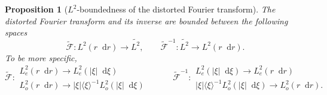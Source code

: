 \documentclass[11 pt]{amsart}
\newtheorem{prop}{Proposition}[section]
\theoremstyle{definition}
\theoremstyle{remark}
\numberwithin{equation}{section}
\newcommand{\dd}{\mathop{}\!\mathrm{d}}
\begin{document}
\begin{prop}[$L^2$-boundedness of the distorted Fourier transform]
\label{propL2}
The distorted Fourier transform and its inverse are bounded between the following spaces
$$
\widetilde{\mathcal{F}} : L^2(r \dd r) \longrightarrow \widetilde{L^2}, \qquad \widetilde{\mathcal{F}}^{-1} : \widetilde{L^2}\longrightarrow L^2(r \dd r). 
$$
To be more specific,
$$
\widetilde{\mathcal{F}} : \begin{array}{l}  L^2_{e}(r\dd r) \longrightarrow L^2_{e}(|\xi|\dd \xi) \\ L^2_{o}(r\dd r) \longrightarrow |\xi| \langle \xi \rangle^{-1}L^2_{o}(|\xi|\dd \xi) \end{array} \qquad \quad
\widetilde{\mathcal{F}}^{-1} : \begin{array}{l}  L^2_{e}(|\xi|\dd \xi) \longrightarrow L^2_{e}(r\dd r)  \\ |\xi| \langle \xi \rangle^{-1}L^2_{o}(|\xi|\dd \xi) \longrightarrow L^2_{o}(r\dd r) .\end{array}
$$
\end{prop}
\end{document}
